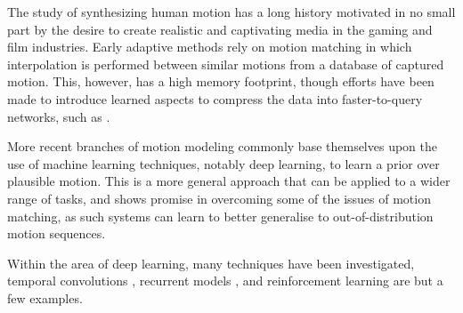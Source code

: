 The study of synthesizing human motion has a long history motivated in no small part by the desire to create realistic and captivating media in the gaming and film industries. Early adaptive methods rely on motion matching \cite{early_motion_matching} \cite{clavet_motion_matching} in which interpolation is performed between similar motions from a database of captured motion. This, however, has a high memory footprint, though efforts have been made to introduce learned aspects to compress the data into faster-to-query networks, such as \cite{holden_motion_matching}.

More recent branches of motion modeling commonly base themselves upon the use of machine learning techniques, notably deep learning, to learn a prior over plausible motion. This is a more general approach that can be applied to a wider range of tasks, and shows promise in overcoming some of the issues of motion matching, as such systems can learn to better generalise to out-of-distribution motion sequences.

Within the area of deep learning, many techniques have been investigated, temporal convolutions \cite{temporal_convolutions}, recurrent models \cite{recurrent_harvey_2020}, and reinforcement learning \cite{rl_cho} are but a few examples.

